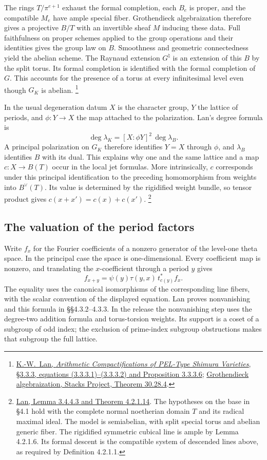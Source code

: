 The rings \(T/\pi^{e+1}\) exhaust the formal completion, each \(B_e\)
is proper, and the compatible \(M_e\) have ample special fiber.
Grothendieck algebraization therefore gives a projective \(B/T\)
with an invertible sheaf \(M\) inducing these data. Full faithfulness
on proper schemes applied to the group operations and their identities
gives the group law on \(B\). Smoothness and geometric connectedness
yield the abelian scheme. The Raynaud extension \(G^\natural\) is an
extension of this \(B\) by the split torus. Its formal completion is
identified with the formal completion of \(G\). This accounts for the
presence of a torus at every infinitesimal level even though \(G_K\)
is abelian.
\footnote{\href{https://www.kwlan.org/articles/cpt-PEL-type-thesis-revision-dense.pdf}{K.-W.~Lan,
\emph{Arithmetic Compactifications of PEL-Type Shimura Varieties},
\S3.3.3, equations (3.3.3.1)--(3.3.3.2) and Proposition 3.3.3.6};
\href{https://stacks.math.columbia.edu/tag/089A}{Grothendieck
algebraization, Stacks Project, Theorem 30.28.4}.}

In the usual degeneration datum \(X\) is the character group, \(Y\)
the lattice of periods, and \(\phi:Y\to X\) the map attached to the
polarization. Lan's degree formula is
\[
  \deg\lambda_K=[X:\phi Y]^2\,\deg\lambda_B.
\]
A principal polarization on \(G_K\) therefore identifies \(Y=X\)
through \(\phi\), and \(\lambda_B\) identifies \(B\) with its dual.
This explains why one and the same lattice and a map \(c:X\to B(T)\)
occur in the local jet formulas. More intrinsically, \(c\) corresponds
under this principal identification to the preceding homomorphism
from weights into \(B^\vee(T)\). Its value is determined by the
rigidified weight bundle, so tensor product gives
\(c(x+x')=c(x)+c(x')\).
\footnote{\href{https://www.kwlan.org/articles/cpt-PEL-type-thesis-revision-dense.pdf}{Lan,
Lemma 3.4.4.3 and Theorem 4.2.1.14}. The hypotheses on the base in
\S4.1 hold with the complete normal noetherian domain \(T\) and its
radical maximal ideal. The model is semiabelian, with split special
torus and abelian generic fiber. The rigidified symmetric cubical line
is ample by Lemma 4.2.1.6. Its formal descent is the compatible system
of descended lines above, as required by Definition 4.2.1.1.}

\subsection{The valuation of the period factors}

Write \(f_x\) for the Fourier coefficients of a nonzero generator of
the level-one theta space. In the principal case the space is
one-dimensional. Every coefficient map is nonzero, and translating
the \(x\)-coefficient through a period \(y\) gives
\[
 f_{x+y}=\psi(y)\tau(y,x)\,t_{c(y)}^* f_x .
\]
The equality uses the canonical isomorphisms of the corresponding
line fibers, with the scalar convention of the displayed equation.
Lan proves nonvanishing and this formula in
\S\S4.3.2--4.3.3. In the release the nonvanishing step uses the
degree-two addition formula and torus-torsion weights. Its support is
a coset of a subgroup of odd index; the exclusion of prime-index
subgroup obstructions makes that subgroup the full lattice.

